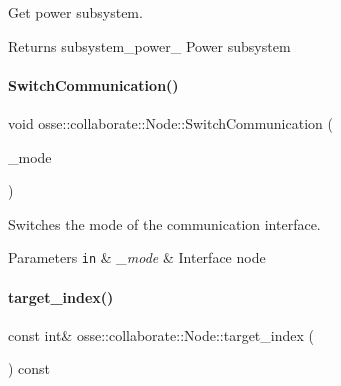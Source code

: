 Get power subsystem. 

\begin{DoxyReturn}{Returns}
subsystem\+\_\+power\+\_\+ Power subsystem 
\end{DoxyReturn}
\mbox{\label{classosse_1_1collaborate_1_1_node_a45e01ee665774552f165918a13009264}} 
\paragraph{\texorpdfstring{Switch\+Communication()}{SwitchCommunication()}}
{\footnotesize\ttfamily void osse\+::collaborate\+::\+Node\+::\+Switch\+Communication (\begin{DoxyParamCaption}\item[{const \hyperlink{classosse_1_1collaborate_1_1_subsystem_comm_a5e1ce4f232ca2aae0b99d1225e682190}{Subsystem\+Comm\+::k\+Mode} \&}]{\+\_\+mode }\end{DoxyParamCaption})}



Switches the mode of the communication interface. 


\begin{DoxyParams}[1]{Parameters}
\mbox{\tt in}  & {\em \+\_\+mode} & Interface node \\
\hline
\end{DoxyParams}
\mbox{\label{classosse_1_1collaborate_1_1_node_ab130d2f7d75dc219b81ce7155e2923e9}} 
\paragraph{\texorpdfstring{target\+\_\+index()}{target\_index()}}
{\footnotesize\ttfamily const int\& osse\+::collaborate\+::\+Node\+::target\+\_\+index (\begin{DoxyParamCaption}{ }\end{DoxyParamCaption}) const\hspace{0.3cm}{\ttfamily [inline]}}



